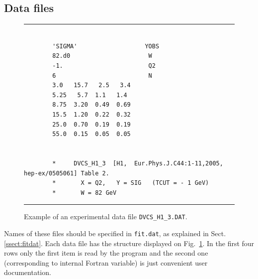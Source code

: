 \documentclass[12pt]{article}
\begin{document}
\subsection{Data files\label{sec:datafiles}}

\begin{figure}[t]
\begin{center}
\hrule
\begin{verbatim}

        'SIGMA'                   YOBS
        82.d0                      W
        -1.                        Q2
        6                          N
        3.0   15.7   2.5   3.4   
        5.25   5.7  1.1   1.4  
        8.75  3.20  0.49  0.69
        15.5  1.20  0.22  0.32
        25.0  0.70  0.19  0.19
        55.0  0.15  0.05  0.05


        *     DVCS_H1_3  [H1,  Eur.Phys.J.C44:1-11,2005, hep-ex/0505061] Table 2.
        *       X = Q2,   Y = SIG   (TCUT = - 1 GeV)
        *       W = 82 GeV

\end{verbatim}
\hrule
\end{center}
\caption{Example of an experimental data file \texttt{DVCS\_H1\_3.DAT}.}
\label{fig:DVCS4.DAT}
\end{figure}

Names of these files should be specified in \texttt{fit.dat}, as explained
in Sect. \ref{ssect:fitdat}.
Each data file has the structure displayed on Fig.~\ref{fig:DVCS4.DAT}. In the first
four rows only the first item is read by the program and the second one
(corresponding to internal Fortran variable) is just convenient user
documentation.
\end{document}
